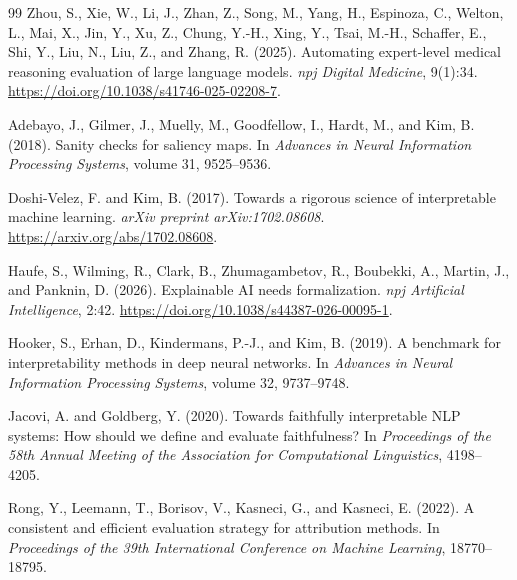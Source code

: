 \documentclass[twoside,11pt]{article}
\begin{document}
\begin{thebibliography}{99}
Zhou, S., Xie, W., Li, J., Zhan, Z., Song, M., Yang, H., Espinoza, C.,
Welton, L., Mai, X., Jin, Y., Xu, Z., Chung, Y.-H., Xing, Y., Tsai, M.-H.,
Schaffer, E., Shi, Y., Liu, N., Liu, Z., and Zhang, R. (2025).
Automating expert-level medical reasoning evaluation of large language models.
\emph{npj Digital Medicine}, 9(1):34.
\url{https://doi.org/10.1038/s41746-025-02208-7}.

Adebayo, J., Gilmer, J., Muelly, M., Goodfellow, I., Hardt, M., and Kim, B.
(2018).
Sanity checks for saliency maps.
In \emph{Advances in Neural Information Processing Systems}, volume 31,
9525--9536.

Doshi-Velez, F. and Kim, B. (2017).
Towards a rigorous science of interpretable machine learning.
\emph{arXiv preprint arXiv:1702.08608}.
\url{https://arxiv.org/abs/1702.08608}.

Haufe, S., Wilming, R., Clark, B., Zhumagambetov, R., Boubekki, A.,
Martin, J., and Panknin, D. (2026).
Explainable {AI} needs formalization.
\emph{npj Artificial Intelligence}, 2:42.
\url{https://doi.org/10.1038/s44387-026-00095-1}.

Hooker, S., Erhan, D., Kindermans, P.-J., and Kim, B. (2019).
A benchmark for interpretability methods in deep neural networks.
In \emph{Advances in Neural Information Processing Systems}, volume 32,
9737--9748.

Jacovi, A. and Goldberg, Y. (2020).
Towards faithfully interpretable {NLP} systems: How should we define and evaluate
faithfulness?
In \emph{Proceedings of the 58th Annual Meeting of the Association for
Computational Linguistics}, 4198--4205.

Rong, Y., Leemann, T., Borisov, V., Kasneci, G., and Kasneci, E. (2022).
A consistent and efficient evaluation strategy for attribution methods.
In \emph{Proceedings of the 39th International Conference on Machine Learning},
18770--18795.


\end{thebibliography}
\end{document}
